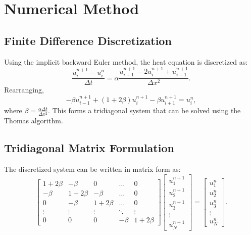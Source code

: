 \documentclass[12pt]{article}
\begin{document}
\section{Numerical Method}

\subsection{Finite Difference Discretization}
Using the implicit backward Euler method, the heat equation is discretized as:
\begin{equation}
    \frac{u_i^{n+1} - u_i^n}{\Delta t} = \alpha \frac{u_{i+1}^{n+1} - 2u_i^{n+1} + u_{i-1}^{n+1}}{\Delta x^2}.
\end{equation}
Rearranging,
\begin{equation}
    -\beta u_{i-1}^{n+1} + (1 + 2\beta) u_i^{n+1} - \beta u_{i+1}^{n+1} = u_i^n,
\end{equation}
where $\beta = \frac{\alpha \Delta t}{\Delta x^2}$.
This forms a tridiagonal system that can be solved using the Thomas algorithm.

\subsection{Tridiagonal Matrix Formulation}
The discretized system can be written in matrix form as:
\begin{equation}
\begin{bmatrix}
    1+2\beta & -\beta & 0 & \dots & 0 \\
    -\beta & 1+2\beta & -\beta & \dots & 0 \\
    0 & -\beta & 1+2\beta & \dots & 0 \\
    \vdots & \vdots & \vdots & \ddots & \vdots \\
    0 & 0 & 0 & -\beta & 1+2\beta
\end{bmatrix}
\begin{bmatrix}
    u_1^{n+1} \\
    u_2^{n+1} \\
    u_3^{n+1} \\
    \vdots \\
    u_N^{n+1}
\end{bmatrix}
=
\begin{bmatrix}
    u_1^n \\
    u_2^n \\
    u_3^n \\
    \vdots \\
    u_N^n
\end{bmatrix}.
\end{equation}
\end{document}
